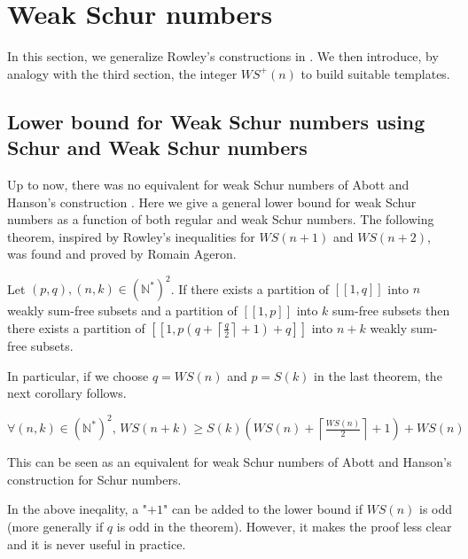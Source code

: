 \section{Weak Schur numbers}

In this section, we generalize Rowley's constructions in \cite{RowleyWS}. We then introduce, by analogy with the third
section, the
integer \(WS^+(n)\)
to build suitable templates.

\subsection{Lower bound for Weak Schur numbers using Schur and Weak Schur numbers}

Up to now, there was no equivalent for weak Schur numbers of Abott and Hanson's construction \cite{AbbottHanson}. Here
we
give a general lower bound for weak Schur numbers as a function of both regular and weak Schur numbers.
The following theorem, inspired by Rowley's inequalities for \(WS(n+1)\) and \(WS(n+2)\), was found and proved
by Romain Ageron.

\begin{theorem}
Let \((p,q), (n,k) \in (\mathbb{N}^*)^2\). If there exists a partition of \([\![1,q]\!]\) into \(n\) weakly sum-free
subsets and a partition of \([\![1,p]\!]\) into \(k\) sum-free
subsets then there exists a partition of \([\![1,p(q+\left \lceil \frac{q}{2} \right \rceil + 1)+q]\!]\) into \(n+k\)
weakly sum-free subsets.
\end{theorem}

In particular, if we choose \(q = WS(n)\) and \(p = S(k)\) in the last theorem, the next corollary follows.

\begin{corollary}
\( \forall (n,k) \in (\mathbb{N}^*)^2 \text{, } WS(n+k) \geqslant S(k) \left (WS(n) + \left \lceil \frac{WS(n)}{2}
\right \rceil +1 \right) + WS(n)\)
\end{corollary}

\begin{remark}
This can be seen as an equivalent for weak Schur numbers of Abott and Hanson's construction for Schur numbers.
\end{remark}

\begin{remark}
In the above ineqality, a "\(+1\)" can be added to the lower bound if \(WS(n)\) is odd (more generally if \(q\) is odd in the theorem). However, it makes the proof less
clear and it is never useful in practice.
\end{remark}

